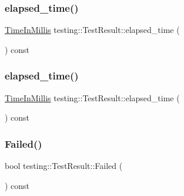 \mbox{\label{classtesting_1_1_test_result_a717e05e00d4af5cb809433e343ab63af}} 
\subsubsection{\texorpdfstring{elapsed\_time()}{elapsed\_time()}\hspace{0.1cm}{\footnotesize\ttfamily [2/3]}}
{\footnotesize\ttfamily \mbox{\hyperlink{namespacetesting_a992de1d091ce660f451d1e8b3ce30fd6}{Time\+In\+Millis}} testing\+::\+Test\+Result\+::elapsed\+\_\+time (\begin{DoxyParamCaption}{ }\end{DoxyParamCaption}) const\hspace{0.3cm}{\ttfamily [inline]}}

\mbox{\label{classtesting_1_1_test_result_a717e05e00d4af5cb809433e343ab63af}} 
\subsubsection{\texorpdfstring{elapsed\_time()}{elapsed\_time()}\hspace{0.1cm}{\footnotesize\ttfamily [3/3]}}
{\footnotesize\ttfamily \mbox{\hyperlink{namespacetesting_a992de1d091ce660f451d1e8b3ce30fd6}{Time\+In\+Millis}} testing\+::\+Test\+Result\+::elapsed\+\_\+time (\begin{DoxyParamCaption}{ }\end{DoxyParamCaption}) const\hspace{0.3cm}{\ttfamily [inline]}}

\mbox{\label{classtesting_1_1_test_result_afacc37e8b43c8574e4101bc61723c769}} 
\subsubsection{\texorpdfstring{Failed()}{Failed()}\hspace{0.1cm}{\footnotesize\ttfamily [1/3]}}
{\footnotesize\ttfamily bool testing\+::\+Test\+Result\+::\+Failed (\begin{DoxyParamCaption}{ }\end{DoxyParamCaption}) const}

